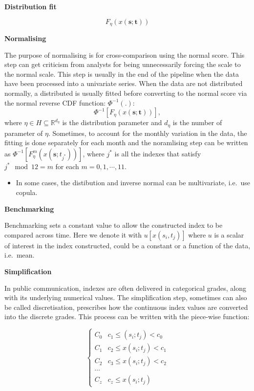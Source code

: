 \documentclass[
]{article}
\providecommand{\tightlist}{%
  \setlength{\itemsep}{0pt}\setlength{\parskip}{0pt}}\usepackage{longtable,booktabs,array}
\begin{document}
\textbf{Distribution fit}

\[F_{\eta}(x(\mathbf{s}; \mathbf{t}))\]

\textbf{Normalising}

The purpose of normalising is for cross-comparison using the normal
score. This step can get criticism from analysts for being unnecessarily
forcing the scale to the normal scale. This step is usually in the end
of the pipeline when the data have been processed into a univariate
series. When the data are not distributed normally, a distributed is
usually fitted before converting to the normal score via the normal
reverse CDF function: \(\Phi^{-1}(.)\):
\[\Phi^{-1}[F_{\eta}(x(\mathbf{s}; \mathbf{t}))],\] where
\(\eta \in H \subseteq \mathbb{R}^{d_{\eta}}\) is the distribution
parameter and \(d_{\eta}\) is the number of parameter of \(\eta\).
Sometimes, to account for the monthly variation in the data, the fitting
is done separately for each month and the noramlising step can be
written as \(\Phi^{-1}[F_{\eta}^m(x(\mathbf{s};t_{j^*}))]\), where
\(j^*\) is all the indexes that satisfy \(j^* \mod 12 = m\) for each
\(m = 0, 1,\cdots, 11\).

\begin{itemize}
\tightlist
\item
  In some cases, the distibution and inverse normal can be multivariate,
  i.e.~use copula.
\end{itemize}

\textbf{Benchmarking}

Benchmarking sets a constant value to allow the constructed index to be
compared across time. Here we denote it with \(u[x(s_i, t_j)]\) where
\(u\) is a scalar of interest in the index constructed, could be a
constant or a function of the data, i.e.~mean.

\textbf{Simplification}

In public communication, indexes are often delivered in categorical
grades, along with its underlying numerical values. The simplification
step, sometimes can also be called discretisation, prescribes how the
continuous index values are converted into the discrete grades. This
process can be written with the piece-wise function:

\[
\begin{cases}
C_0 & c_1 \leq (s_i; t_j) < c_0 \\
C_1 & c_2 \leq x(s_i; t_j) < c_1 \\
C_2 & c_3 \leq x(s_i; t_j) < c_2 \\
\cdots \\
C_z & c_z \leq x(s_i; t_j)
\end{cases}
\]
\end{document}

